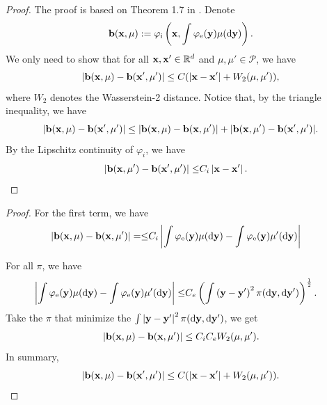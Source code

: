 \documentclass[aspectratio=169]{beamer}
\begin{document}
\begin{frame}
    \begin{proof}
    The proof is based on Theorem 1.7 in \cite{carmona2016lectures}. Denote \[
    \mathbf{b}(\mathbf{x},\mu) := \varphi_{\text{i}}\left(\mathbf{x},\int  \varphi_{\text{e}}(\mathbf{y} ) \mu (\mathrm{d}\mathbf{y})\right).
    \]We only need to show that for all $\mathbf{x},\mathbf{x}'\in \mathbb R^d$ and $\mu,\mu'\in \mathcal P$, we have 
    \[
    |\mathbf{b}(\mathbf{x},\mu) - \mathbf{b} (\mathbf{x}',\mu')|\leq C(|\mathbf{x}-\mathbf{x}'|+W_2(\mu,\mu')),
    \]
    where $W_2$ denotes the Wasserstein-2 distance. Notice that, by the triangle inequality, we have 
    \[
    |\mathbf{b}(\mathbf{x},\mu) - \mathbf{b} (\mathbf{x}',\mu')| \leq \left|\mathbf{b}(\mathbf{x},\mu) - \mathbf{b} (\mathbf{x},\mu')\right| +|\mathbf{b}(\mathbf{x},\mu') - \mathbf{b} (\mathbf{x}',\mu')|.
    \]
    By the Lipschitz continuity of $\varphi_i$, we have 
    \[
    \begin{aligned}
    \left|\mathbf{b}(\mathbf{x},\mu') - \mathbf{b} (\mathbf{x}',\mu')\right| 
    \leq & C_i\left|\mathbf{x}-\mathbf{x}'\right|.
    \end{aligned}
    \]
\end{proof}
\end{frame}
\begin{frame}
\begin{proof}
    For the first term, we have 
    \[
    \begin{aligned}
       \left |\mathbf{b}(\mathbf{x},\mu) - \mathbf{b} (\mathbf{x},\mu')\right| =
       \leq&  C_i\left| 
       \int  \varphi_{\text{e}}(\mathbf{y} ) \mu (\mathrm{d}\mathbf{y}) - \int  \varphi_{\text{e}}(\mathbf{y} ) \mu' (\mathrm{d}\mathbf{y})
       \right|
    \end{aligned}
    \]

For all $\pi$, we have
\[
\begin{aligned}
    \left| 
       \int  \varphi_{\text{e}}(\mathbf{y} ) \mu (\mathrm{d}\mathbf{y}) - \int  \varphi_{\text{e}}(\mathbf{y} ) \mu' (\mathrm{d}\mathbf{y})
       \right| 
       \leq & C_e \left(\int\left(
        \mathbf{y} -
        \mathbf{y}' \right)^2\pi(\mathrm{d} \mathbf{y},\mathrm{d} \mathbf{y}')\right)^{\frac{1}{2}}.
\end{aligned}
\]
Take the $\pi$ that minimize the $\int\left|
        \mathbf{y} -
        \mathbf{y}' \right|^2\pi(\mathrm{d} \mathbf{y},\mathrm{d} \mathbf{y}')$, we get
\[
\begin{aligned}
    \left |\mathbf{b}(\mathbf{x},\mu) - \mathbf{b} (\mathbf{x},\mu')\right| \leq C_i C_e W_2(\mu,\mu').
\end{aligned}
\]
In summary,
  \[
    |\mathbf{b}(\mathbf{x},\mu) - \mathbf{b} (\mathbf{x}',\mu')|\leq C(|\mathbf{x}-\mathbf{x}'|+W_2(\mu,\mu')).
    \]
\end{proof}
\end{frame}
\end{document}
